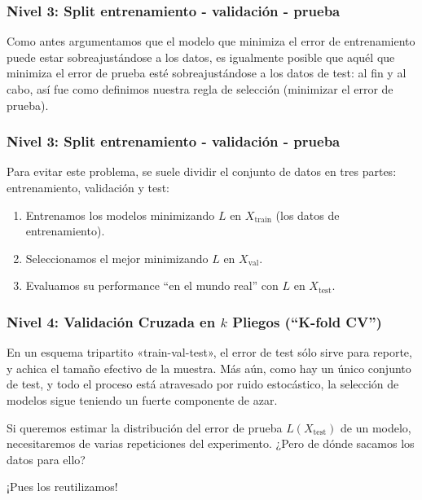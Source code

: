 \documentclass[aspectratio=169,12pt]{beamer}
\begin{document}

\begin{frame}
\frametitle{Nivel 3: Split entrenamiento - validación - prueba}

Como antes argumentamos que el modelo que minimiza el error de entrenamiento
puede estar sobreajustándose a los datos, es igualmente posible que aquél que minimiza el error de prueba esté sobreajustándose a los datos de test: al fin y al cabo, así fue como definimos nuestra regla de selección (minimizar el error de prueba).
\end{frame}


\begin{frame}
\frametitle{Nivel 3: Split entrenamiento - validación - prueba}

Para evitar este problema, se suele dividir el conjunto de datos en tres partes: entrenamiento, validación y test:
\begin{enumerate}
\item Entrenamos los modelos minimizando $L$ en $X_{\text{train}}$ (los datos de entrenamiento).
\item Seleccionamos el mejor minimizando $L$ en $X_{\text{val}}$.
\item Evaluamos su performance ``en el mundo real'' con $L$ en $X_{\text{test}}$.
\end{enumerate}

\end{frame}


\begin{frame}
\frametitle{Nivel 4: Validación Cruzada en $k$ Pliegos (``K-fold CV'')}

En un esquema tripartito «train-val-test», el error de test sólo sirve para reporte, y
achica el tamaño efectivo de la muestra. Más aún, como hay un único conjunto de
test, y todo el proceso está atravesado por ruido estocástico, la selección de modelos
sigue teniendo un fuerte componente de azar.

Si queremos estimar la distribución del error de prueba $L(X_{\text{test}})$ de un modelo, necesitaremos de varias repeticiones del experimento. ¿Pero de dónde sacamos los datos para ello?

¡Pues los reutilizamos!

\end{frame}
\end{document}

